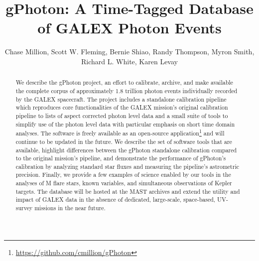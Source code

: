 \documentclass[preprint]{aastex}
\begin{document}
\title{gPhoton: A Time-Tagged Database of GALEX Photon Events}

\author{
Chase Million,
Scott W. Fleming,
Bernie Shiao,
Randy Thompson,
Myron Smith,
Richard L. White,
Karen Levay}



\begin{abstract}
We describe the gPhoton project, an effort to calibrate, archive, and make available the complete corpus of approximately 1.8 trillion photon events individually recorded by the GALEX spacecraft. The project includes a standalone calibration pipeline which reproduces core functionalities of the GALEX mission's original calibration pipeline to lists of aspect corrected photon level data and a small suite of tools to simplify use of the photon level data with particular emphasis on short time domain analyses.  The software is freely available as an open-source application\footnote{\url{https://github.com/cmillion/gPhoton}} and will continue to be updated in the future.  We describe the set of software tools that are available, highlight differences between the gPhoton standalone calibration compared to the original mission's pipeline, and demonstrate the performance of gPhoton's calibration by analyzing standard star fluxes and measuring the pipeline's astrometric precision.  Finally, we provide a few examples of science enabled by our tools in the analyses of M flare stars, known variables, and simultaneous observations of Kepler targets.  The database will be hosted at the MAST archives and extend the utility and impact of GALEX data in the absence of dedicated, large-scale, space-based, UV-survey missions in the near future.
\end{abstract}
\end{document}
